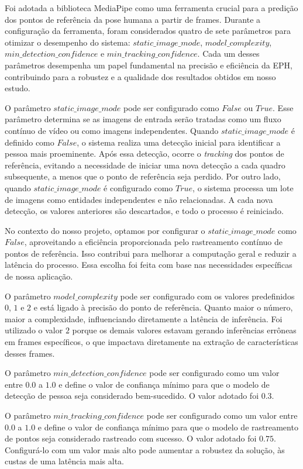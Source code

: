 Foi adotada a biblioteca MediaPipe como uma ferramenta crucial para a predição dos pontos de referência da pose humana a partir de frames. Durante a configuração da ferramenta, foram considerados quatro de sete parâmetros para otimizar o desempenho do sistema: $static\_image\_mode$, $model\_complexity$, $min\_detection\_confidence$ e $min\_tracking\_confidence$. Cada um desses parâmetros desempenha um papel fundamental na precisão e eficiência da \ac{EPH}, contribuindo para a robustez e a qualidade dos resultados obtidos em nosso estudo.

O parâmetro $static\_image\_mode$ pode ser configurado como $False$ ou $True$. Esse parâmetro determina se as imagens de entrada serão tratadas como um fluxo contínuo de vídeo ou como imagens independentes. Quando $static\_image\_mode$ é definido como $False$, o sistema realiza uma detecção inicial para identificar a pessoa mais proeminente. Após essa detecção, ocorre o \textit{tracking} dos pontos de referência, evitando a necessidade de iniciar uma nova detecção a cada quadro subsequente, a menos que o ponto de referência seja perdido. Por outro lado, quando $static\_image\_mode$ é configurado como $True$, o sistema processa um lote de imagens como entidades independentes e não relacionadas. A cada nova detecção, os valores anteriores são descartados, e todo o processo é reiniciado.

No contexto do nosso projeto, optamos por configurar o $static\_image\_mode$ como $False$, aproveitando a eficiência proporcionada pelo rastreamento contínuo de pontos de referência. Isso contribui para melhorar a computação geral e reduzir a latência do processo. Essa escolha foi feita com base nas necessidades específicas de nossa aplicação.

O parâmetro $model\_complexity$ pode ser configurado com os valores predefinidos $0$, $1$ e $2$ e está ligado à precisão do ponto de referência. Quanto maior o número, maior a complexidade, influenciando diretamente a latência de inferência. Foi utilizado o valor $2$ porque os demais valores estavam gerando inferências errôneas em frames específicos, o que impactava diretamente na extração de características desses frames.

O parâmetro $min\_detection\_confidence$ pode ser configurado como um valor entre $0.0$ a $1.0$ e define o valor de confiança mínimo para que o modelo de detecção de pessoa seja considerado bem-sucedido. O valor adotado foi $0.3$.

O parâmetro $min\_tracking\_confidence$ pode ser configurado como um valor entre $0.0$ a $1.0$ e define o valor de confiança mínimo para que o modelo de rastreamento de pontos seja considerado rastreado com sucesso. O valor adotado foi $0.75$. Configurá-lo com um valor mais alto pode aumentar a robustez da solução, às custas de uma latência mais alta.

